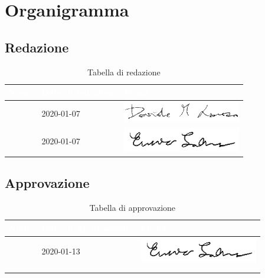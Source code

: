 \section{Organigramma}
\subsection{Redazione}
{
	\renewcommand{\arraystretch}{2}
	\begin{longtable}{ C{5cm} C{4cm} C{5cm} }
		\caption{Tabella di redazione}\\
		\textcolor{white}{\textbf{Nome}} & \textcolor{white}{\textbf{Data di redazione}} & \textcolor{white}{\textbf{Firma}}\\
		\endhead
        
        \LD{} & 2020-01-07 &
        \includegraphics[scale=0.60]{Sezioni/Immagini/Firme/Davide.png}  \\
        \SE{} & 2020-01-07 &
        \includegraphics[scale=0.70]{Sezioni/Immagini/Firme/Enrico.png}  \\
        		
	\end{longtable}
}

\subsection{Approvazione}
{
	\renewcommand{\arraystretch}{2}
	\centering
	\begin{longtable}{ C{5cm} C{4cm} C{5cm} }
		\caption{Tabella di approvazione}\\
		\textcolor{white}{\textbf{Nome}} & \textcolor{white}{\textbf{Data di Approvazione}} & \textcolor{white}{\textbf{Firma}}\\	\endhead
		
		
		\SE{} & 2020-01-13 &  
		\includegraphics[scale=0.70]{Sezioni/Immagini/Firme/Enrico.png}\\
		\VT{} &  & \\
		\CR{} & &  \\
		
	\end{longtable}
}

